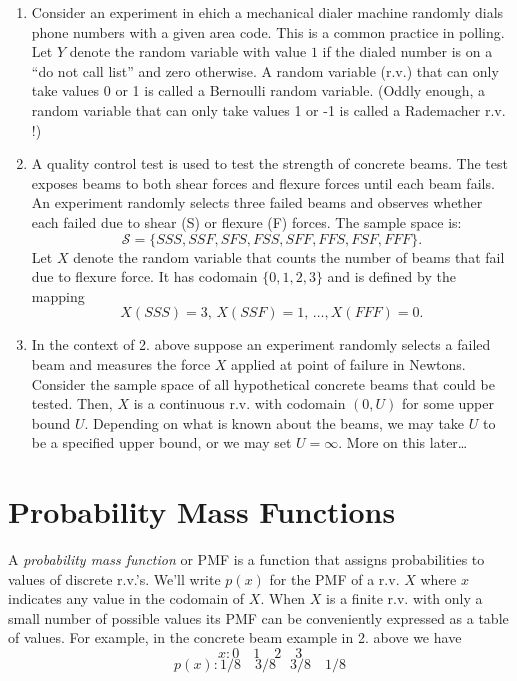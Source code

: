 \documentclass[]{book}
\begin{document}
\begin{enumerate}
\def\labelenumi{\arabic{enumi}.}
\item
  Consider an experiment in ehich a mechanical dialer machine randomly
  dials phone numbers with a given area code. This is a common practice
  in polling. Let \(Y\) denote the random variable with value \(1\) if
  the dialed number is on a ``do not call list'' and zero otherwise. A
  random variable (r.v.) that can only take values 0 or 1 is called a
  Bernoulli random variable. (Oddly enough, a random variable that can
  only take values 1 or -1 is called a Rademacher r.v. !)
\item
  A quality control test is used to test the strength of concrete beams.
  The test exposes beams to both shear forces and flexure forces until
  each beam fails. An experiment randomly selects three failed beams and
  observes whether each failed due to shear (S) or flexure (F) forces.
  The sample space is:
  \[\mathcal{S} = \{SSS, SSF, SFS, FSS, SFF, FFS, FSF, FFF\}.\] Let
  \(X\) denote the random variable that counts the number of beams that
  fail due to flexure force. It has codomain \(\{0,1,2,3\}\) and is
  defined by the mapping
  \[X(SSS) = 3, \, X(SSF) = 1, \, \ldots, X(FFF) = 0.\]
\item
  In the context of 2. above suppose an experiment randomly selects a
  failed beam and measures the force \(X\) applied at point of failure
  in Newtons. Consider the sample space of all hypothetical concrete
  beams that could be tested. Then, \(X\) is a continuous r.v. with
  codomain \((0,U)\) for some upper bound \(U\). Depending on what is
  known about the beams, we may take \(U\) to be a specified upper
  bound, or we may set \(U = \infty\). More on this later\ldots{}
\end{enumerate}

\section{Probability Mass Functions}\label{probability-mass-functions}

A \emph{probability mass function} or PMF is a function that assigns
probabilities to values of discrete r.v.'s. We'll write \(p(x)\) for the
PMF of a r.v. \(X\) where \(x\) indicates any value in the codomain of
\(X\). When \(X\) is a finite r.v. with only a small number of possible
values its PMF can be conveniently expressed as a table of values. For
example, in the concrete beam example in 2. above we have
\[x: 0 \quad 1\quad 2\quad 3\] \[p(x):1/8\quad 3/8\quad 3/8 \quad 1/8\]
\end{document}
